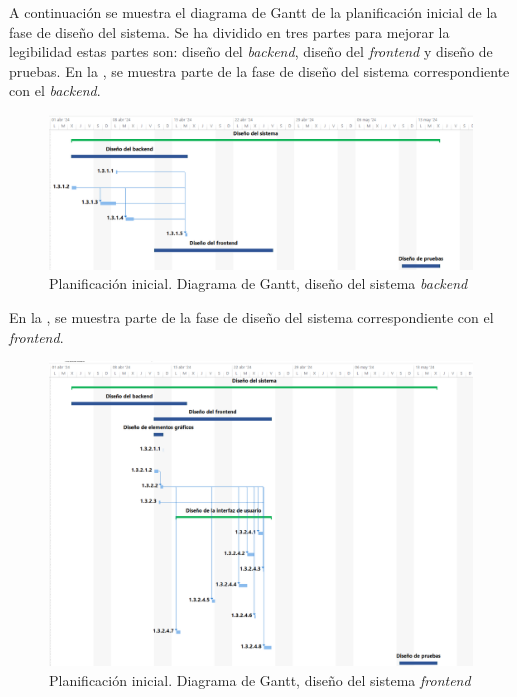 A continuación se muestra el diagrama de Gantt de la planificación inicial de la fase de diseño del sistema. Se ha dividido en tres partes para mejorar la legibilidad estas partes son: diseño del \textit{backend}, diseño del \textit{frontend} y diseño de pruebas.
En la , se muestra parte de la fase de diseño del sistema correspondiente con el \textit{backend}.
\begin{figure}[H]
    \hypertarget{fig:5_PI-Gantt-Diseno-1}{}
    \centering
    \includegraphics[width=1\linewidth]{figures/5-Gantt/5-Gantt-Diseno-backend.png}
    \caption{Planificación inicial. Diagrama de Gantt, diseño del sistema \textit{backend}}
    \label{fig:5_PI-Gantt-Diseno-1}
\end{figure}
En la , se muestra parte de la fase de diseño del sistema correspondiente con el \textit{frontend}.
\begin{figure}[H]
    \hypertarget{fig:5_PI-Gantt-Diseno-2}{}
    \centering
    \includegraphics[width=1\linewidth]{figures/5-Gantt/5-Gantt-Diseno-frontend.png}
    \caption{Planificación inicial. Diagrama de Gantt, diseño del sistema \textit{frontend}}
    \label{fig:5_PI-Gantt-Diseno-2}
\end{figure}
